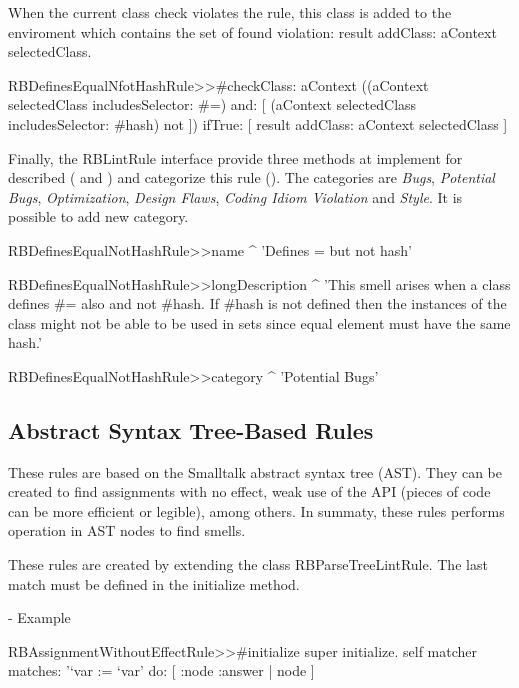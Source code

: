 \documentclass[a4paper,10pt,twoside]{book}
\begin{document}
When the current class check violates the rule, this class is added to the enviroment which contains the set of found violation: result addClass: aContext selectedClass. 

\begin{code}{}
RBDefinesEqualNfotHashRule>>#checkClass: aContext 
	((aContext selectedClass includesSelector: #=) and: 
		[ (aContext selectedClass includesSelector: #hash) not ])
			 ifTrue: [ result addClass: aContext selectedClass ]
\end{code}



Finally, the RBLintRule interface provide three methods at implement for described ( and ) and categorize this rule (). The categories are \emph{Bugs}, \emph{Potential Bugs}, \emph{Optimization}, \emph{Design Flaws}, \emph{Coding Idiom Violation} and \emph{Style}. It is possible to add new category.

\begin{code}{}
RBDefinesEqualNotHashRule>>name
	^ 'Defines = but not hash'
\end{code}

\begin{code}{}
RBDefinesEqualNotHashRule>>longDescription
	^ 'This smell arises when a class defines #= also and not #hash. If #hash is not defined then the instances of the class might not be able to be used in sets since equal element must have the same hash.'
\end{code}

\begin{code}{}
RBDefinesEqualNotHashRule>>category 
	^ 'Potential Bugs'
\end{code}

\subsection{Abstract Syntax Tree-Based Rules}

These rules are based on the Smalltalk abstract syntax tree (AST). They can be created to find assignments with no effect, weak use of the API (pieces of code can be more efficient or legible), among others. In summaty, these rules performs operation in AST nodes to find smells.

These rules are created by extending the class RBParseTreeLintRule. The last match must be defined in the initialize method.


- Example

\begin{code}{}
RBAssignmentWithoutEffectRule>>#initialize
	super initialize.
	self matcher 
		matches: '`var := `var'
		do: [ :node :answer | node ]
\end{code}
\end{document}
